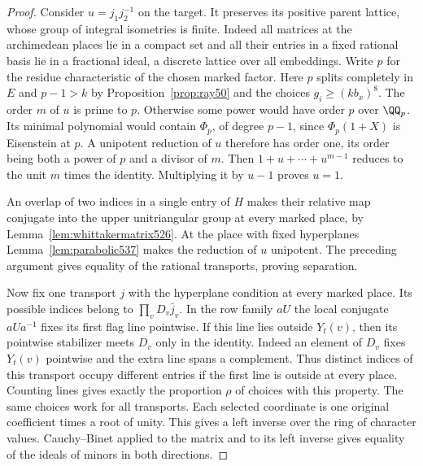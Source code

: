 \documentclass[a4paper,11pt]{article}
\theoremstyle{definition}
\theoremstyle{remark}
\numberwithin{equation}{section}
\begin{document}
\begin{proof}
Consider \(u=j_1j_2^{-1}\) on the target. It preserves its positive
parent lattice, whose group of integral isometries is finite.
Indeed all matrices at the archimedean places lie in a compact
set and all their entries in a fixed rational basis lie in a
fractional ideal, a discrete lattice over all embeddings.
Write \(p\) for the residue characteristic of the chosen marked
factor. Here \(p\) splits completely in \(E\) and \(p-1>k\)
by Proposition~\ref{prop:ray50} and the choices
\(g_i\ge(kb_x)^8\). The order \(m\) of \(u\) is prime to \(p\).
Otherwise some power would have order \(p\) over \(\QQ_p\).
Its minimal polynomial would contain \(\Phi_p\), of degree
\(p-1\), since \(\Phi_p(1+X)\) is Eisenstein at \(p\).
A unipotent reduction of \(u\) therefore has order one, its
order being both a power of \(p\) and a divisor of \(m\).
Then \(1+u+\cdots+u^{m-1}\) reduces to the unit \(m\) times
the identity. Multiplying it by \(u-1\) proves \(u=1\).

An overlap of two indices in a single entry of \(H\) makes
their relative map conjugate into the upper unitriangular group
at every marked place, by Lemma~\ref{lem:whittakermatrix526}.
At the place with fixed hyperplanes Lemma~\ref{lem:parabolic537}
makes the reduction of \(u\) unipotent. The preceding argument
gives equality of the rational transports, proving separation.

Now fix one transport \(j\) with the hyperplane condition at
every marked place. Its possible indices belong to
\(\prod_v D_v\bar j_v\). In the row family \(aU\) the local
conjugate \(aUa^{-1}\) fixes its first flag line pointwise.
If this line lies outside \(Y_t(v)\), then its pointwise
stabilizer meets \(D_v\) only in the identity. Indeed an
element of \(D_v\) fixes \(Y_t(v)\) pointwise and the extra
line spans a complement. Thus distinct indices of this
transport occupy different entries if the first line is
outside at every place. Counting lines gives exactly the
proportion \(\rho\) of choices with this property. The same
choices work for all transports. Each selected coordinate
is one original coefficient times a root of unity. This
gives a left inverse over the ring of character values.
Cauchy--Binet applied to the matrix and to its left inverse
gives equality of the ideals of minors in both directions.


\end{proof}
\end{document}
